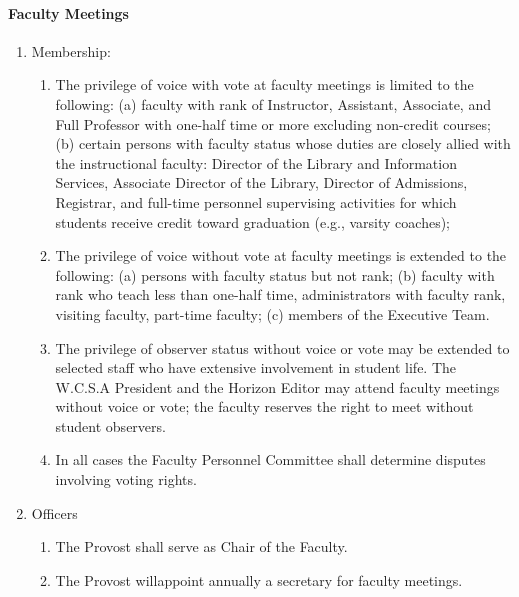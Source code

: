 \documentclass[letterpaper, 11pt]{article}
\begin{document}
			\paragraph{Faculty Meetings}
				\begin{enumerate}[label=\alph*)]
					\item{Membership:
						\begin{enumerate}[label=\arabic*)]
							\item{The privilege of voice with vote at faculty meetings is limited to the following:
								(a) faculty with rank of Instructor, Assistant, Associate, and Full Professor with one-half time or more excluding non-credit courses;
								(b) certain persons with faculty status whose duties are closely allied with the instructional faculty:  Director of the Library and Information Services, Associate Director of the Library, Director of Admissions, Registrar, and full-time personnel supervising activities for which students receive credit toward graduation (e.g., varsity coaches);}
							\item{The privilege of voice without vote at faculty meetings is extended to the following:
								(a) persons with faculty status but not rank;
								(b) faculty with rank who teach less than one-half time, administrators with faculty rank, visiting faculty, part-time faculty;
								(c) members of the Executive Team.}
							\item{The privilege of observer status without voice or vote may be extended to selected staff who have extensive involvement in student life.  The W.C.S.A President and the Horizon Editor may attend faculty meetings without voice or vote; the faculty reserves the right to meet without student observers.}
							\item{In all cases the Faculty Personnel Committee shall determine disputes involving voting rights.}
						\end{enumerate}
					}
					\item{Officers
						\begin{enumerate}[label=\arabic*)]
							\item{The Provost shall serve as Chair of the Faculty.}
							\item{The Provost willappoint annually a secretary for faculty meetings.}


\end{enumerate}}
\end{enumerate}
\end{document}
